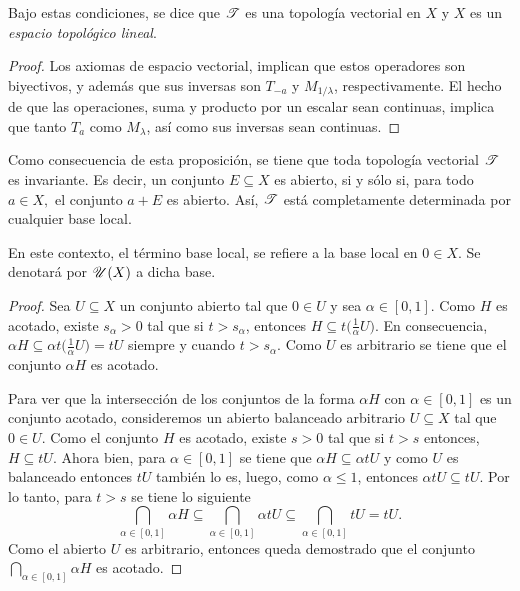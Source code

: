Bajo estas condiciones, se dice que $\mathscr{T}$ es una topología vectorial
en $X$ y $X$ es un \textit{espacio topológico lineal}.



\begin{proof}
Los axiomas de espacio vectorial, implican que estos
operadores son biyectivos, y además que sus inversas 
son $T_{-a}$ y $M_{1/\lambda}$, respectivamente. 
El hecho de que las operaciones, suma y producto por un 
escalar sean continuas, implica que tanto $T_a$ como 
$M_\lambda$, así como sus inversas sean continuas.
\end{proof}

Como consecuencia de esta proposición, se tiene que 
toda topología vectorial $\mathscr{T}$ es invariante. Es decir, 
un conjunto $E\subseteq X$ es abierto, si y sólo si, para todo $a\in X,$
el conjunto $a+E$ es abierto. Así, $\mathscr{T}$ está completamente
determinada por cualquier base local.

En este contexto, el término base local, se refiere a la base 
local en $0\in X$.
Se denotará por $\mathscr{U}(X)$ a dicha base.

\begin{proof}
Sea $U\subseteq X$ un conjunto abierto tal que $0\in U$ y
sea $\alpha\in[0,1]$. 
Como $H$ es acotado, existe $s_\alpha>0$ tal que si $t>s_\alpha$, entonces
$H\subseteq t\big(\frac1\alpha U\big)$. En consecuencia, 
$\alpha H\subseteq \alpha t\big(\frac1\alpha U\big)=tU$ siempre y cuando
$t>s_\alpha$. Como $U$ es arbitrario se tiene que el conjunto
$\alpha H$ es acotado. 

Para ver que la intersección de los conjuntos de la forma $\alpha H$
con $\alpha\in[0,1]$ es un conjunto acotado, consideremos un abierto balanceado arbitrario
$U\subseteq X$ tal que $0\in U$. Como el conjunto $H$ es acotado, existe $s>0$
tal que si $t>s$ entonces, $H\subseteq tU$. Ahora bien, para $\alpha\in[0,1]$
se tiene que $\alpha H\subseteq \alpha tU$ y como 
$U$ es balanceado entonces $tU$ también lo es, luego,
como $\alpha\leq1$, entonces $\alpha tU\subseteq tU$. 
Por lo tanto, para $t>s$ se tiene lo siguiente
$$
\bigcap_{\alpha\in[0,1]}\alpha H\subseteq\bigcap_{\alpha\in[0,1]}\alpha tU
\subseteq\bigcap_{\alpha\in[0,1]}tU=tU.
$$
Como el abierto $U$ es arbitrario, entonces queda demostrado que el conjunto 
$\bigcap_{\alpha\in[0,1]} \alpha H$ es acotado.

\end{proof}

